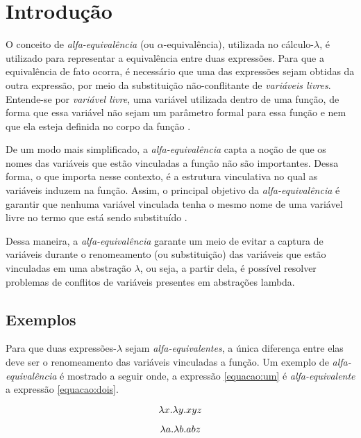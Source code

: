 \section{Introdução}
\label{secao:introducao}

O conceito de \textit{alfa-equivalência} (ou $\alpha$-equivalência), utilizada no cálculo-$\lambda$, é utilizado para representar a equivalência entre duas expressões. Para que a equivalência de fato ocorra, é necessário que uma das expressões sejam obtidas da outra expressão, por meio da substituição não-conflitante de \emph{variáveis livres}. Entende-se por \emph{variável livre}, uma variável utilizada dentro de uma função, de forma que essa variável não sejam um parâmetro formal para essa função e nem que ela esteja definida no corpo da função \cite{gabbay2000theory}.

De um modo mais simplificado, a \textit{alfa-equivalência} capta a noção de que os nomes das variáveis que estão vinculadas a função não são importantes. Dessa forma, o que importa nesse contexto, é a estrutura vinculativa no qual as variáveis induzem na função. Assim, o principal objetivo da \textit{alfa-equivalência} é garantir que nenhuma variável vinculada tenha o mesmo nome de uma variável livre no termo que está sendo substituído \cite{calves2008nominal}. 

Dessa maneira, a \textit{alfa-equivalência} garante um meio de evitar a captura de variáveis durante o renomeamento (ou substituição) das variáveis que estão vinculadas em uma abstração $\lambda$, ou seja, a partir dela, é possível resolver problemas de conflitos de variáveis presentes em abstrações lambda. 

\subsection{Exemplos}

Para que duas expressões-$\lambda$ sejam \textit{alfa-equivalentes}, a única diferença entre elas deve ser o renomeamento das variáveis vinculadas a função. Um exemplo de \textit{alfa-equivalência} é mostrado a seguir onde, a expressão \ref{equacao:um} é \textit{alfa-equivalente} a expressão \ref{equacao:dois}.

\begin{equation}
	\label{equacao:um}
	\lambda\\x.\lambda\\y.xyz
\end{equation}

\begin{equation}
	\label{equacao:dois}
	\lambda\\a.\lambda\\b.abz
\end{equation}

